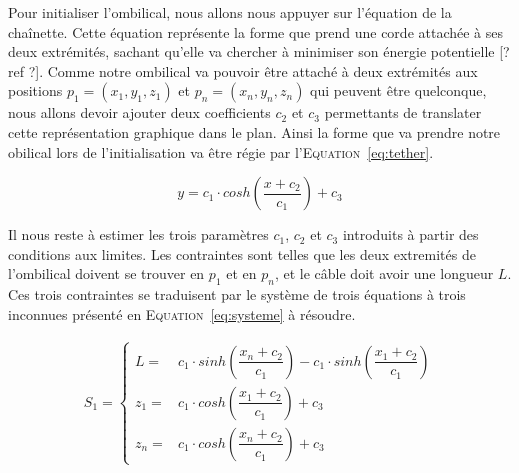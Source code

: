     Pour initialiser l'ombilical, nous allons nous appuyer sur l'équation de la chaînette. Cette équation représente la forme que prend une corde attachée à ses deux extrémités, sachant qu'elle va chercher à minimiser son énergie potentielle [? ref ?]. Comme notre ombilical va pouvoir être attaché à deux extrémités aux positions $p_1 = (x_1, y_1, z_1)$ et $p_n = (x_n, y_n, z_n)$ qui peuvent être quelconque, nous allons devoir ajouter deux coefficients $c_2$ et $c_3$ permettants de translater cette représentation graphique dans le plan. Ainsi la forme que va prendre notre obilical lors de l'initialisation va être régie par l'\textsc{Equation}~\ref{eq:tether}.

    \begin{equation}
        y = c_1\cdot cosh\left(\frac{x + c_2}{c_1}\right) + c_3
        \label{eq:tether}
    \end{equation}

    Il nous reste à estimer les trois paramètres $c_1$, $c_2$ et $c_3$ introduits à partir des conditions aux limites. Les contraintes sont telles que les deux extremités de l'ombilical doivent se trouver en $p_1$ et en $p_n$, et le câble doit avoir une longueur $L$. Ces trois contraintes se traduisent par le système de trois équations à trois inconnues présenté en \textsc{Equation}~\ref{eq:systeme} à résoudre.
    
    \begin{align}
        S_1 = 
        \begin{cases}
            L   = & c_1 \cdot sinh\left(\dfrac{x_n+c_2}{c_1}\right) - c_1 \cdot sinh\left(\dfrac{x_1+c_2}{c_1}\right) \\
            z_1 = & c_1 \cdot cosh\left(\dfrac{x_1+c_2}{c_1}\right)+c_3 \\
            z_n = & c_1 \cdot cosh\left(\dfrac{x_n+c_2}{c_1}\right)+c_3
        \end{cases}
        \label{eq:systeme}
    \end{align}

